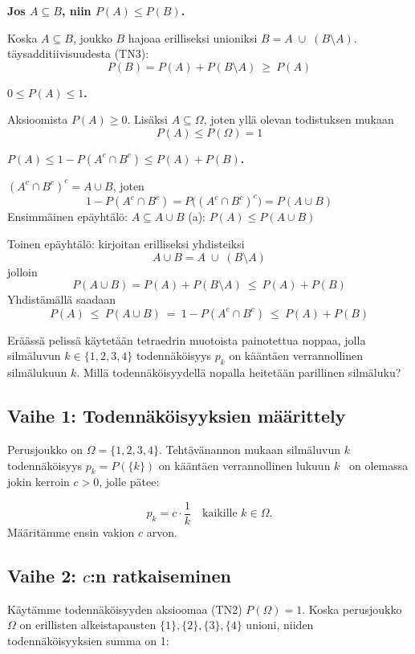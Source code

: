 \documentclass[12pt,a4paper]{article}
\begin{document}
\begin{kohta}
  \item \textbf{Jos $A\subseteq B$, niin $P(A)\le P(B)$.}

  Koska $A\subseteq B$, joukko $B$ hajoaa erilliseksi unioniksi $B=A\;\cup\;(B\setminus A)$. 
  täysadditiivisuudesta (TN3):
  \[
  P(B)=P(A)+P(B\setminus A)\ \ge\ P(A)
  \]


    
  \item \textbf{$0\le P(A)\le 1$.}

  Aksioomista $P(A)\ge 0$. Lisäksi $A\subseteq\Omega$, joten yllä olevan todistuksen mukaan
  \[
  P(A)\le P(\Omega)=1
  \]



  \item \textbf{$P(A)\le 1-P(A^c\cap B^c)\le P(A)+P(B)$.}

$(A^c\cap B^c)^c=A\cup B$, joten
  \[
  1-P(A^c\cap B^c)=P\big((A^c\cap B^c)^c\big)=P(A\cup B)
  \]
  Ensimmäinen epäyhtälö: $A\subseteq A\cup B$ \Rightarrow (a): $P(A)\le P(A\cup B)$

  Toinen epäyhtälö: kirjoitan erilliseksi yhdisteiksi
  \[
  A\cup B = A\;\cup\;(B\setminus A)
  \]
  jolloin
  \[
  P(A\cup B)=P(A)+P(B\setminus A)\ \le\ P(A)+P(B)
  \]
  Yhdistämällä saadaan
  \[
  P(A)\ \le\ P(A\cup B)\ =\ 1-P(A^c\cap B^c)\ \le\ P(A)+P(B)
  \]
\end{kohta}






\pagebreak
{}
Eräässä pelissä käytetään tetraedrin muotoista painotettua noppaa, jolla silmäluvun $k\in\{1,2,3,4\}$ todennäköisyys $p_k$ on kääntäen verrannollinen silmälukuun $k$. Millä todennäköisyydellä nopalla heitetään parillinen silmäluku?
\vspace{0.4cm}



\subsection*{Vaihe 1: Todennäköisyyksien määrittely}
Perusjoukko on $\Omega = \{1, 2, 3, 4\}$.
Tehtävänannon mukaan silmäluvun $k$ todennäköisyys $p_k = P(\{k\})$ on 
kääntäen verrannollinen lukuun $k$ \Rightarrow \ on olemassa 
jokin kerroin $c > 0$, jolle pätee:

\[
p_k = c \cdot \frac{1}{k} \quad \text{kaikille } k \in \Omega.
\]
Määritämme ensin vakion $c$ arvon.

\subsection*{Vaihe 2: $c$:n ratkaiseminen}
Käytämme todennäköisyyden aksioomaa (TN2) $P(\Omega) = 1$.
Koska perusjoukko $\Omega$ on erillisten alkeistapausten 
$\{1\}, \{2\}, \{3\}, \{4\}$ unioni, niiden todennäköisyyksien 
summa on 1:
\end{document}
